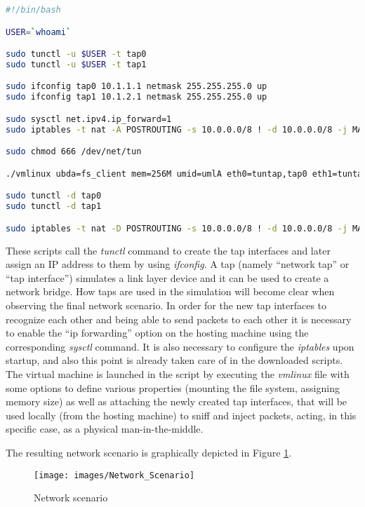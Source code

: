 \begin{lstlisting}[language=bash, caption=\textit{client.sh}, label=clientconf]
#!/bin/bash

USER=`whoami`

sudo tunctl -u $USER -t tap0
sudo tunctl -u $USER -t tap1

sudo ifconfig tap0 10.1.1.1 netmask 255.255.255.0 up
sudo ifconfig tap1 10.1.2.1 netmask 255.255.255.0 up

sudo sysctl net.ipv4.ip_forward=1
sudo iptables -t nat -A POSTROUTING -s 10.0.0.0/8 ! -d 10.0.0.0/8 -j MASQUERADE

sudo chmod 666 /dev/net/tun

./vmlinux ubda=fs_client mem=256M umid=umlA eth0=tuntap,tap0 eth1=tuntap,tap1

sudo tunctl -d tap0
sudo tunctl -d tap1

sudo iptables -t nat -D POSTROUTING -s 10.0.0.0/8 ! -d 10.0.0.0/8 -j MASQUERADE
\end{lstlisting}

These scripts call the \textit{tunctl} command to create the tap interfaces and later assign an IP address to them by using \textit{ifconfig}. A tap (namely ``network tap'' or ``tap interface'') simulates a link layer device and it can be used to create a network bridge. How taps are used in the simulation will become clear when observing the final network scenario.
In order for the new tap interfaces to recognize each other and being able to send packets to each other it is necessary to enable the ``ip forwarding'' option on the hosting machine using the corresponding \textit{sysctl} command. It is also necessary to configure the \textit{iptables} upon startup, and also this point is already taken care of in the downloaded scripts. The virtual machine is launched in the script by executing the \textit{vmlinux} file with some options to define various properties (mounting the file system, assigning memory size) as well as attaching the newly created tap interfaces, that will be used locally (from the hosting machine) to sniff and inject packets, acting, in this specific case, as a physical man-in-the-middle.

The resulting network scenario is graphically depicted in Figure \ref{fig:networkscenario}.

\begin{figure}[!htb]
\centering
\texttt{[image: images/Network\_Scenario]}
\caption{Network scenario}
\label{fig:networkscenario}
\end{figure}

